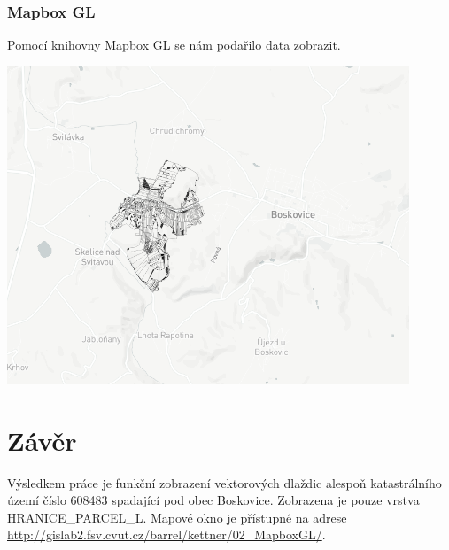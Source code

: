 \documentclass[12pt]{article}
\begin{document}
\subsubsection{Mapbox GL}
Pomocí knihovny Mapbox GL se nám podařilo data zobrazit.

\begin{center}
	\includegraphics[width=12cm]{./img/mapboxGL_ukazka_dat.png}
\end{center}


\clearpage
\section{Závěr}
Výsledkem práce je funkční zobrazení vektorových dlaždic alespoň katastrálního území číslo 608483 spadající pod obec Boskovice. Zobrazena je pouze vrstva \mbox{HRANICE\_PARCEL\_L}. Mapové okno je přístupné na adrese \url{http://gislab2.fsv.cvut.cz/barrel/kettner/02_MapboxGL/}.



\newpage

\listoffigures


\listoftables

\nocite{*}
{}

    
\end{document}

